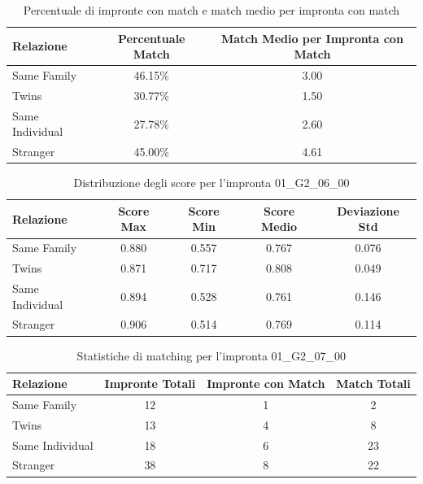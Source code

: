 \begin{table}[htbp]
\centering
\caption{Percentuale di impronte con match e match medio per impronta con match}
\label{tab:match_percentage_01_G2_06_00}
\begin{tabular}{|l|c|c|}
\hline
\textbf{Relazione} & \textbf{Percentuale Match} & \textbf{Match Medio per Impronta con Match} \\
\hline
Same Family & 46.15\% & 3.00 \\
\hline
Twins & 30.77\% & 1.50 \\
\hline
Same Individual & 27.78\% & 2.60 \\
\hline
Stranger & 45.00\% & 4.61 \\
\hline
\end{tabular}
\end{table}


\begin{table}[htbp]
\centering
\caption{Distribuzione degli score per l'impronta 01\_G2\_06\_00}
\label{tab:scores_01_G2_06_00}
\begin{tabular}{|l|c|c|c|c|}
\hline
\textbf{Relazione} & \textbf{Score Max} & \textbf{Score Min} & \textbf{Score Medio} & \textbf{Deviazione Std} \\
\hline
Same Family & 0.880 & 0.557 & 0.767 & 0.076 \\
\hline
Twins & 0.871 & 0.717 & 0.808 & 0.049 \\
\hline
Same Individual & 0.894 & 0.528 & 0.761 & 0.146 \\
\hline
Stranger & 0.906 & 0.514 & 0.769 & 0.114 \\
\hline
\end{tabular}
\end{table}


\begin{table}[htbp]
\centering
\caption{Statistiche di matching per l'impronta 01\_G2\_07\_00}
\label{tab:results_01_G2_07_00}
\begin{tabular}{|l|c|c|c|}
\hline
\textbf{Relazione} & \textbf{Impronte Totali} & \textbf{Impronte con Match} & \textbf{Match Totali} \\
\hline
Same Family & 12 & 1 & 2 \\
\hline
Twins & 13 & 4 & 8 \\
\hline
Same Individual & 18 & 6 & 23 \\
\hline
Stranger & 38 & 8 & 22 \\
\hline
\end{tabular}
\end{table}


